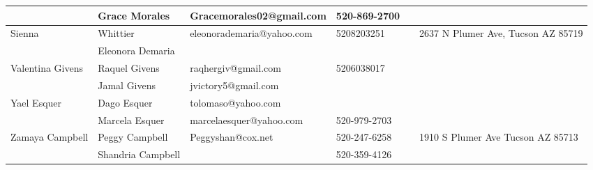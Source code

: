 \documentclass[landscape]{article}\usepackage[]{graphicx}\usepackage[]{color}
\begin{document}
\begin{longtable}{|p{100pt}|p{100pt}|p{140pt}|p{60pt}|p{64pt}|p{120pt}|}
 & Grace Morales  & Gracemorales02@gmail.com & 520-869-2700 &  & \\
\hline
\multirow{2}{100pt}{Sienna} & Whittier & eleonorademaria@yahoo.com & 5208203251 &  & \multirow{2}{120pt}{2637 N Plumer Ave, Tucson AZ 85719} \\
 & Eleonora Demaria &  &  &  & \\
\hline
\multirow{2}{100pt}{Valentina Givens} & Raquel Givens & raqhergiv@gmail.com & 5206038017 &  & \multirow{2}{120pt}{} \\
 & Jamal Givens & jvictory5@gmail.com &  &  & \\
\hline
\multirow{2}{100pt}{Yael Esquer} & Dago Esquer & tolomaso@yahoo.com &  &  & \multirow{2}{120pt}{} \\
 & Marcela Esquer & marcelaesquer@yahoo.com & 520-979-2703 &  & \\
\hline
\multirow{2}{100pt}{Zamaya Campbell } & Peggy Campbell  & Peggyshan@cox.net & 520-247-6258 &  & \multirow{2}{120pt}{1910 S Plumer Ave Tucson AZ 85713} \\
 & Shandria Campbell  &  & 520-359-4126 &  & \\
\hline
\end{longtable}
\newpage
\end{document}
